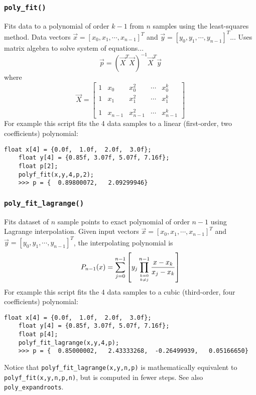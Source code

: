 \subsubsection{{\tt poly\_fit()}}
\label{module:math:poly:polyf_fit}
Fits data to a polynomial of order $k-1$ from $n$ samples using the
least-squares method.
Data vectors
$\vec{x}=[x_0,x_1,\cdots,x_{n-1}]^T$ and 
$\vec{y}=[y_0,y_1,\cdots,y_{n-1}]^T$...
Uses matrix algebra to solve system of equations...
\[
    \vec{p} = \left(\vec{X}^T\vec{X}\right)^{-1}\vec{X}^T\vec{y}
\]
where
\[
    \vec{X} = 
    \begin{bmatrix}
        1   & x_0       & x_0^2     & \cdots    & x_0^{k}     \\
        1   & x_1       & x_1^2     & \cdots    & x_1^{k}     \\
        \\
        1   & x_{n-1}   & x_{n-1}^2 & \cdots    & x_{n-1}^{k}
    \end{bmatrix}
\]
%
For example this script fits the 4 data samples to a linear
(first-order, two coefficients) polynomial:
%
\begin{Verbatim}[fontsize=\small]
    float x[4] = {0.0f,  1.0f,  2.0f,  3.0f};
    float y[4] = {0.85f, 3.07f, 5.07f, 7.16f};
    float p[2];
    polyf_fit(x,y,4,p,2);
    >>> p = {  0.89800072,   2.09299946}
\end{Verbatim}


\subsubsection{{\tt poly\_fit\_lagrange()}}
\label{module:math:poly:polyf_fit_lagrange}
Fits dataset of $n$ sample points to exact polynomial of order $n-1$ using
Lagrange interpolation.
Given input vectors
$\vec{x}=[x_0,x_1,\cdots,x_{n-1}]^T$ and 
$\vec{y}=[y_0,y_1,\cdots,y_{n-1}]^T$, the interpolating polynomial is
\[
    P_{n-1}(x) =
        \sum_{j=0}^{n-1} {
            \left[
            y_j
            \prod_{{k=0}\atop{k \ne j}}^{n-1} {
                \frac{x-x_k}{x_j-x_k}
            }
            \right]
        }
\]
%
For example this script fits the 4 data samples to a cubic
(third-order, four coefficients) polynomial:
%
\begin{Verbatim}[fontsize=\small]
    float x[4] = {0.0f,  1.0f,  2.0f,  3.0f};
    float y[4] = {0.85f, 3.07f, 5.07f, 7.16f};
    float p[4];
    polyf_fit_lagrange(x,y,4,p);
    >>> p = {  0.85000002,   2.43333268,  -0.26499939,   0.05166650}
\end{Verbatim}
%
Notice that {\tt polyf\_fit\_lagrange(x,y,n,p)}
is mathematically equivalent to {\tt polyf\_fit(x,y,n,p,n)},
but is computed in fewer steps.
%
See also {\tt poly\_expandroots}.

